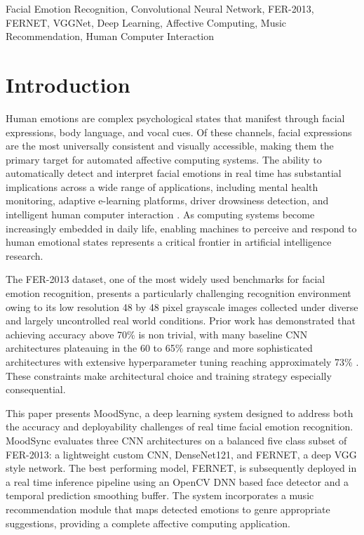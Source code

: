 \documentclass[conference]{IEEEtran}
\begin{document}
\begin{IEEEkeywords}
Facial Emotion Recognition, Convolutional Neural Network, FER-2013,
FERNET, VGGNet, Deep Learning, Affective Computing, Music Recommendation,
Human Computer Interaction
\end{IEEEkeywords}

\section{Introduction}

Human emotions are complex psychological states that manifest through facial
expressions, body language, and vocal cues. Of these channels, facial
expressions are the most universally consistent and visually accessible,
making them the primary target for automated affective computing systems.
The ability to automatically detect and interpret facial emotions in real
time has substantial implications across a wide range of applications,
including mental health monitoring, adaptive e-learning platforms, driver
drowsiness detection, and intelligent human computer interaction \cite{b1}.
As computing systems become increasingly embedded in daily life, enabling
machines to perceive and respond to human emotional states represents a
critical frontier in artificial intelligence research.

The FER-2013 dataset, one of the most widely used benchmarks for facial
emotion recognition, presents a particularly challenging recognition
environment owing to its low resolution 48 by 48 pixel grayscale images
collected under diverse and largely uncontrolled real world conditions.
Prior work has demonstrated that achieving accuracy above 70\% is non
trivial, with many baseline CNN architectures plateauing in the 60 to 65\%
range and more sophisticated architectures with extensive hyperparameter
tuning reaching approximately 73\% \cite{b3}. These constraints make
architectural choice and training strategy especially consequential.

This paper presents MoodSync, a deep learning system designed to address
both the accuracy and deployability challenges of real time facial emotion
recognition. MoodSync evaluates three CNN architectures on a balanced five
class subset of FER-2013: a lightweight custom CNN, DenseNet121, and
FERNET, a deep VGG style network. The best performing model, FERNET, is
subsequently deployed in a real time inference pipeline using an OpenCV DNN
based face detector and a temporal prediction smoothing buffer. The system
incorporates a music recommendation module that maps detected emotions to
genre appropriate suggestions, providing a complete affective computing
application.
\end{document}
